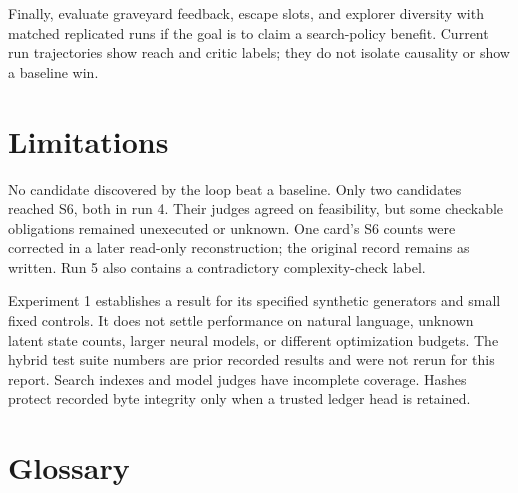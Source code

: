 Finally, evaluate graveyard feedback, escape slots, and explorer diversity with matched replicated runs if the goal is to claim a search-policy benefit. Current run trajectories show reach and critic labels; they do not isolate causality or show a baseline win.

\section{Limitations}

No candidate discovered by the loop beat a baseline. Only two candidates reached S6, both in run 4. Their judges agreed on feasibility, but some checkable obligations remained unexecuted or unknown. One card's S6 counts were corrected in a later read-only reconstruction; the original record remains as written. Run 5 also contains a contradictory complexity-check label.

Experiment 1 establishes a result for its specified synthetic generators and small fixed controls. It does not settle performance on natural language, unknown latent state counts, larger neural models, or different optimization budgets. The hybrid test suite numbers are prior recorded results and were not rerun for this report. Search indexes and model judges have incomplete coverage. Hashes protect recorded byte integrity only when a trusted ledger head is retained.

\clearpage
\appendix
\section{Glossary}

